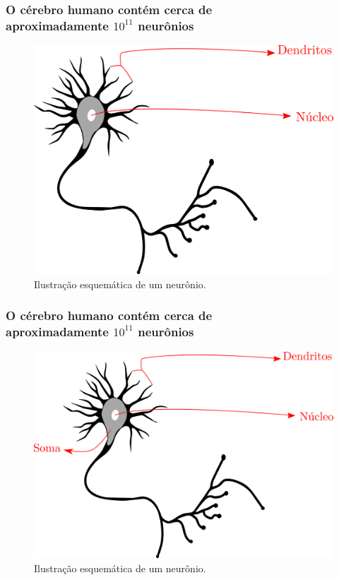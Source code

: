 \documentclass[10pt]{beamer} %
\begin{document}
\begin{frame}
	\frametitle{O cérebro humano contém cerca de \\ aproximadamente $10^{11}$   neurônios}
	\begin{figure}
		\centering
		\includegraphics[scale=0.2]{Imagens/nucleo.png} 
		\caption{Ilustração esquemática de um neurônio.}
	\end{figure}
\end{frame}

\begin{frame}
	\frametitle{O cérebro humano contém cerca de \\ aproximadamente $10^{11}$   neurônios}
	\begin{figure}
		\centering
		\includegraphics[scale=0.2]{Imagens/soma.png} 
		\caption{Ilustração esquemática de um neurônio.}
	\end{figure}
\end{frame}
\end{document}
